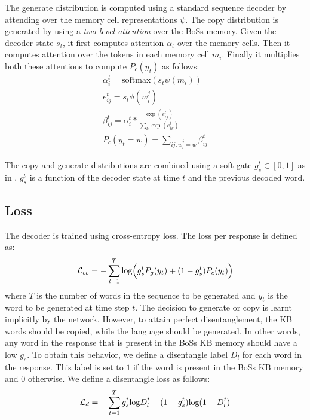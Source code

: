 The generate distribution is computed using a standard sequence decoder \cite{sutskever2014sequence} by attending \cite{luong2015effective} over the memory cell representations $\psi$. The copy distribution is generated by using a \textit{two-level attention} over the {\sc BoSs} memory. Given the decoder state $s_t$, it first computes attention $\alpha_t$ over the memory cells. Then it computes attention over the tokens in each memory cell $m_i$. Finally it multiplies both these attentions to compute $P_c(y_t)$ as follows: 
\begin{gather}
\alpha_i^t = \text{softmax}(s_t \psi(m_i)) \\
e_{ij}^t = s_t \phi(w_i^j) \\
\beta^{t}_{ij} = \alpha^t_i * \frac{\exp({e_{ij}^t})}{\sum\nolimits_{k}\exp({e_{ik}^t})} \\
P_c(y_t=w)=\sum_{ij:w_i^j=w} \beta_{ij}^{t}
\end{gather}


The copy and generate distributions are combined using a soft gate $g_s^t \in [0,1]$ as in \cite{see2017get}. $g_s^t$ is a function of the decoder state at time $t$ and the previous decoded word.

\subsection{Loss}
The decoder is trained using cross-entropy loss. The loss per response is defined as:
\begin{equation}
\mathcal{L}_{ce} = - \sum_{t=1}^{T} \textup{log} \Big( g_s^{t}P_g(y_t) + (1-g_s^{t})P_c(y_t) \Big) 
\end{equation}
where $T$ is the number of words in the sequence to be generated and $y_t$ is the word to be generated at time step $t$. The decision to generate or copy is learnt implicitly by the network. However, to attain perfect disentanglement, the KB words should be copied, while the language should be generated. In other words, any word in the response that is present in the {\sc BoSs} KB memory should have a low $g_s$. To obtain this behavior, we define a disentangle label $D_{l}$ for each word in the response. This label is set to $1$ if the word is present in the {\sc BoSs} KB memory and $0$ otherwise.
We define a disentangle loss as follows:
\begin{equation}
\mathcal{L}_{d} = - \sum_{t=1}^{T} g_s^{t}\textup{log}D^{t}_{l} + (1-g_s^{t})\textup{log}(1-D^{t}_{l})
\end{equation}

